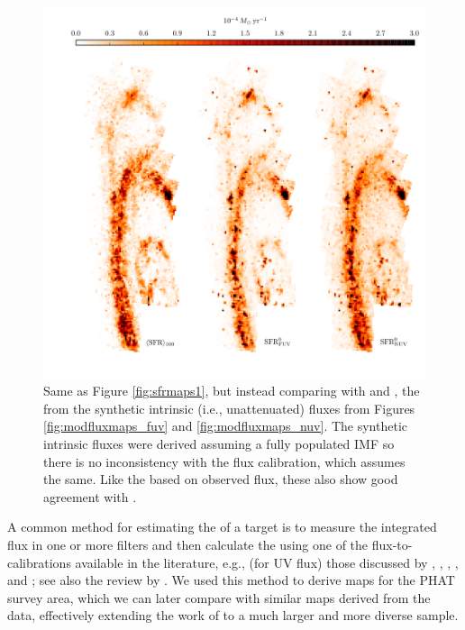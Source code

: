 \documentclass[iop, tighten]{emulateapj}
\begin{document}
\begin{figure}
\centering
\includegraphics[width=\textwidth]{m31flux-figures/sfrmaps2.pdf}
\caption[\sfr{} maps from estimates based on synthetic intrinsic fluxes
compared with the mean \sfr{} map from the .]{Same as Figure
    \ref{fig:sfrmaps1}, but instead comparing \sfroneh{} with \sfrfuvz{} and
    \sfrnuvz{}, the  from the synthetic intrinsic (i.e., unattenuated)
    fluxes from Figures \ref{fig:modfluxmaps_fuv} and
    \ref{fig:modfluxmaps_nuv}. The synthetic intrinsic fluxes were derived
    assuming a fully populated IMF so there is no inconsistency with the flux
    calibration, which assumes the same. Like the  based on observed
    flux, these  also show good agreement with \sfroneh{}.
}
\label{fig:sfrmaps2}
\end{figure}


A common method for estimating the \sfr{} of a target is to measure the
integrated flux in one or more filters and then calculate the \sfr{} using one
of the flux-to-\sfr{} calibrations available in the literature, e.g., (for UV
flux) those discussed by \citet{Kennicutt:1998}, \citet{Salim:2007},
\citet{Hao:2011}, \citet{Murphy:2011}, and \citet{Leroy:2012}; see also the
review by \citet{Kennicutt:2012}. We used this method to derive \sfr{} maps for
the PHAT survey area, which we can later compare with similar maps derived from
the \citet{Lewis:2014} \sfh{} data, effectively extending the work of
\citet{Simones:2014} to a much larger and more diverse sample.
\end{document}
